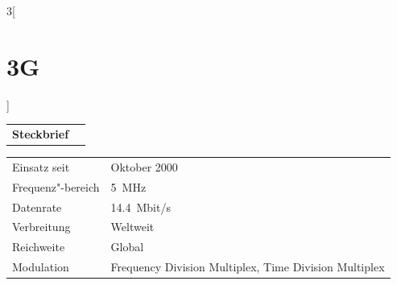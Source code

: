 \begin{multicols}{3}[\section{3G}]


\newrefsegment

\begin{tabular}{p{}p{2.7 cm}}
\textbf{Steckbrief}& \\
\end{tabular}
\begin{tabular}{p{}p{2.7 cm}}
      Einsatz seit & Oktober 2000\\
      Frequenz"-bereich  & \SI{5}{\mega\hertz}\\
      Datenrate & \SI{14,4}{Mbit/s}\\
      Verbreitung & Weltweit\\
      Reichweite & Global\\
      Modulation & Frequency Division Multiplex, \newline Time Division Multiplex\\
\end{tabular}
\par

\end{multicols}
